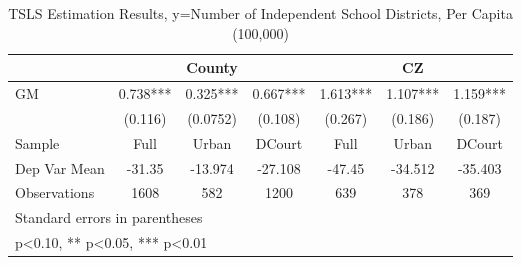 \begin{table}[htbp]\centering
\def\sym#1{\ifmmode^{#1}\else\(^{#1}\)\fi}
\caption{TSLS Estimation Results, y=Number of Independent School Districts, Per Capita (100,000)}
\begin{tabular}{l*{6}{c}}
\toprule
                &\multicolumn{3}{c}{County}            &\multicolumn{3}{c}{CZ}                \\\cmidrule(lr){2-4}\cmidrule(lr){5-7}
\midrule
GM              &    0.738***&    0.325***&    0.667***&    1.613***&    1.107***&    1.159***\\
                &  (0.116)   & (0.0752)   &  (0.108)   &  (0.267)   &  (0.186)   &  (0.187)   \\
\midrule
Sample          &     Full   &    Urban   &   DCourt   &     Full   &    Urban   &   DCourt   \\
Dep Var Mean    &   -31.35   &  -13.974   &  -27.108   &   -47.45   &  -34.512   &  -35.403   \\
Observations    &     1608   &      582   &     1200   &      639   &      378   &      369   \\
\bottomrule
\multicolumn{7}{l}{\footnotesize Standard errors in parentheses}\\
\multicolumn{7}{l}{\footnotesize * p<0.10, ** p<0.05, *** p<0.01}\\
\end{tabular}
\end{table}
